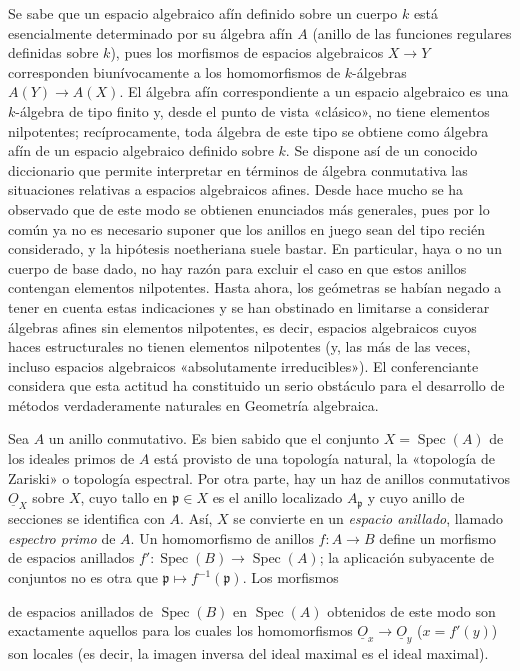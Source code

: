 \documentclass[11pt,twoside,openany]{book}
\numberwithin{equation}{section}
\newcommand{\src}[1]{%
  \phantomsection\hypertarget{src:#1}{}%
  \marginpar{\raggedleft\footnotesize\sffamily #1}%
}
\newcommand{\Osh}{\underline{O}}
\theoremstyle{plain}
\theoremstyle{definition}
\theoremstyle{remark}
\newcommand{\FgaUnitKey}{frontmatter}
\renewcommand{\src}[1]{%
  \phantomsection\hypertarget{src:\FgaUnitKey:#1}{}%
  \marginpar{\raggedleft\footnotesize\sffamily #1}%
}
\theoremstyle{plain}
\theoremstyle{definition}
\theoremstyle{remark}
\begin{document}
Se sabe que un espacio algebraico afín definido sobre un cuerpo $k$ está
esencialmente determinado por su álgebra afín $A$ (anillo de las funciones
regulares definidas sobre $k$), pues los morfismos de espacios algebraicos
$X\longrightarrow Y$ corresponden biunívocamente a los homomorfismos de
$k$-álgebras $A(Y)\longrightarrow A(X)$. El álgebra afín correspondiente a un
espacio algebraico es una $k$-álgebra de tipo finito y, desde el punto de vista
«clásico», no tiene elementos nilpotentes; recíprocamente, toda álgebra de este
tipo se obtiene como álgebra afín de un espacio algebraico definido sobre $k$.
Se dispone así de un conocido diccionario que permite interpretar en términos
de álgebra conmutativa las situaciones relativas a espacios algebraicos afines.
Desde hace mucho se ha observado que de este modo se obtienen enunciados más
generales, pues por lo común ya no es necesario suponer que los anillos en juego
sean del tipo recién considerado, y la hipótesis noetheriana suele bastar. En
particular, haya o no un cuerpo de base dado, no hay razón para excluir el caso
en que estos anillos contengan elementos nilpotentes. Hasta ahora, los geómetras
se habían negado a tener en cuenta estas indicaciones y se han obstinado en
limitarse a considerar álgebras afines sin elementos nilpotentes, es decir,
espacios algebraicos cuyos haces estructurales no tienen elementos nilpotentes
(y, las más de las veces, incluso espacios algebraicos «absolutamente
irreducibles»). El conferenciante considera que esta actitud ha constituido un
serio obstáculo para el desarrollo de métodos verdaderamente naturales en
Geometría algebraica.

Sea $A$ un anillo conmutativo. Es bien sabido que el conjunto
$X=\operatorname{Spec}(A)$ de los ideales primos de $A$ está provisto de una
topología natural, la «topología de Zariski» o topología espectral. Por otra
parte, hay un haz de anillos conmutativos $\Osh_X$ sobre $X$, cuyo tallo en
$\mathfrak p\in X$ es el anillo localizado $A_{\mathfrak p}$ y cuyo anillo de
secciones se identifica con $A$. Así, $X$ se convierte en un \emph{espacio
anillado}, llamado \emph{espectro primo} de $A$. Un homomorfismo de anillos
$f:A\longrightarrow B$ define un morfismo de espacios anillados
$f':\operatorname{Spec}(B)\longrightarrow\operatorname{Spec}(A)$; la
aplicación subyacente de conjuntos no es otra que
$\mathfrak p\longmapsto f^{-1}(\mathfrak p)$. Los morfismos

\src{194}
de espacios anillados de $\operatorname{Spec}(B)$ en
$\operatorname{Spec}(A)$ obtenidos de este modo son exactamente aquellos para
los cuales los homomorfismos $\Osh_x\longrightarrow\Osh_y$ ($x=f'(y)$) son
locales (es decir, la imagen inversa del ideal maximal es el ideal maximal).
\end{document}
